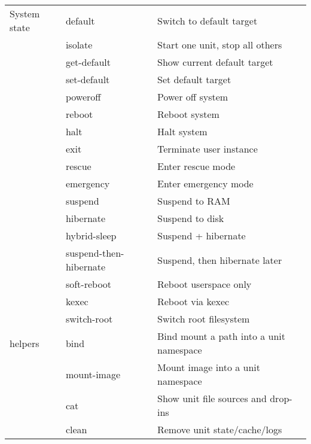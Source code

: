 \documentclass[openany, 12pt]{book}
\begin{document}
\begin{longtable}{lll}
  \midrule
  System state  & default                & Switch to default target                \\
                & isolate                & Start one unit, stop all others         \\
                & get-default            & Show current default target             \\
                & set-default            & Set default target                      \\
                & poweroff               & Power off system                        \\
                & reboot                 & Reboot system                           \\
                & halt                   & Halt system                             \\
                & exit                   & Terminate user instance                 \\
                & rescue                 & Enter rescue mode                       \\
                & emergency              & Enter emergency mode                    \\
                & suspend                & Suspend to RAM                          \\
                & hibernate              & Suspend to disk                         \\
                & hybrid-sleep           & Suspend + hibernate                     \\
                & suspend-then-hibernate & Suspend, then hibernate later           \\
                & soft-reboot            & Reboot userspace only                   \\
                & kexec                  & Reboot via kexec                        \\
                & switch-root            & Switch root filesystem                  \\
  \midrule
  helpers       & bind                   & Bind mount a path into a unit namespace \\
                & mount-image            & Mount image into a unit namespace       \\
                & cat                    & Show unit file sources and drop-ins     \\
                & clean                  & Remove unit state/cache/logs            \\

\end{longtable}
\end{document}
